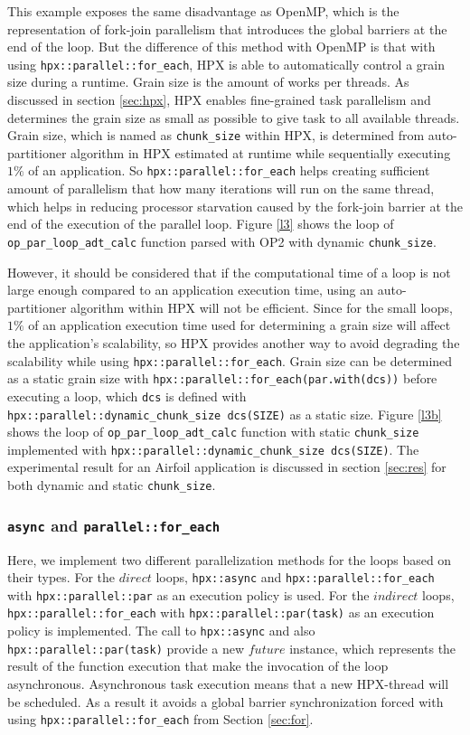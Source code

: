 \documentclass[conference]{IEEEtran}
\begin{document}
This example exposes the same disadvantage as OpenMP, which is the representation of fork-join parallelism that introduces the global barriers at the end of the loop. But the difference of this method with OpenMP is that with using \texttt{hpx::parallel::for\_each}, HPX is able to automatically control a grain size during a runtime. Grain size is the amount of works per threads. As discussed in section \ref{sec:hpx}, HPX enables fine-grained task parallelism and determines the grain size as small as possible to give task to all available threads. Grain size, which is named as \texttt{chunk\_size} within HPX, is determined from auto-partitioner algorithm in HPX estimated at runtime while sequentially executing $1\%$ of an application. So \texttt{hpx::parallel::for\_each} helps creating sufficient amount of parallelism that how many iterations will run on the same thread, which helps in reducing processor starvation caused by the fork-join barrier at the end of the execution of the parallel loop.  Figure \ref{l3} shows the loop of \texttt{op\_par\_loop\_adt\_calc} function parsed with OP2 with dynamic \texttt{chunk\_size}. 

However, it should be considered that if the computational time of a loop is not large enough compared to an application execution time, using an auto-partitioner algorithm within HPX will not be efficient. Since for the small loops, $1\%$ of an application execution time used for determining a grain size will affect the application's scalability, so HPX provides another way to avoid degrading the scalability while using \texttt{hpx::parallel::for\_each}. Grain size can be determined as a static grain size with \texttt{hpx::parallel::for\_each(par.with(dcs))} before executing a loop, which \texttt{dcs} is defined with \texttt{hpx::parallel::dynamic\_chunk\_size dcs(SIZE)} as a static size.  Figure \ref{l3b} shows the loop of \texttt{op\_par\_loop\_adt\_calc} function with static \texttt{chunk\_size} implemented with \texttt{hpx::parallel::dynamic\_chunk\_size dcs(SIZE)}. The experimental result for an Airfoil application is discussed in section \ref{sec:res} for both dynamic and static \texttt{chunk\_size}.

\subsubsection{\textbf{\texttt{async} and \texttt{parallel::for\_each}}}
\label{sec:async}

Here, we implement two different parallelization methods for the loops based on their types. For the $direct$ loops, \texttt{hpx::async} and \texttt{hpx::parallel::for\_each} with \texttt{hpx::parallel::par} as an execution policy is used. For  the $indirect$ loops,  \texttt{hpx::parallel::for\_each} with \texttt{hpx::parallel::par(task)} as an execution policy is implemented. The call to \texttt{hpx::async} and also \texttt{hpx::parallel::par(task)} provide a new $future$ instance, which represents the result of the function execution that make the invocation of the loop asynchronous. Asynchronous task execution means that a new HPX-thread will be scheduled. As a result it avoids a global barrier synchronization forced with using \texttt{hpx::parallel::for\_each} from Section \ref{sec:for}.
\end{document}
